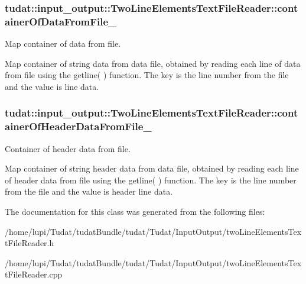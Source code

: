 \subsubsection[{\texorpdfstring{container\+Of\+Data\+From\+File\+\_\+}{containerOfDataFromFile_}}]{ tudat\+::input\+\_\+output\+::\+Two\+Line\+Elements\+Text\+File\+Reader\+::container\+Of\+Data\+From\+File\+\_\+\hspace{0.3cm}{\ttfamily [protected]}}\hypertarget{classtudat_1_1input__output_1_1TwoLineElementsTextFileReader_a1c6c0f8b0d5129531660e25722b86572}{}\label{classtudat_1_1input__output_1_1TwoLineElementsTextFileReader_a1c6c0f8b0d5129531660e25722b86572}


Map container of data from file. 

Map container of string data from data file, obtained by reading each line of data from file using the getline( ) function. The key is the line number from the file and the value is line data. 
\subsubsection[{\texorpdfstring{container\+Of\+Header\+Data\+From\+File\+\_\+}{containerOfHeaderDataFromFile_}}]{ tudat\+::input\+\_\+output\+::\+Two\+Line\+Elements\+Text\+File\+Reader\+::container\+Of\+Header\+Data\+From\+File\+\_\+\hspace{0.3cm}{\ttfamily [protected]}}\hypertarget{classtudat_1_1input__output_1_1TwoLineElementsTextFileReader_aaadd05e1ca6685848534e1d6f4b4292d}{}\label{classtudat_1_1input__output_1_1TwoLineElementsTextFileReader_aaadd05e1ca6685848534e1d6f4b4292d}


Container of header data from file. 

Map container of string header data from data file, obtained by reading each line of header data from file using the getline( ) function. The key is the line number from the file and the value is header line data. 

The documentation for this class was generated from the following files\+:\begin{DoxyCompactItemize}
\item 
/home/lupi/\+Tudat/tudat\+Bundle/tudat/\+Tudat/\+Input\+Output/two\+Line\+Elements\+Text\+File\+Reader.\+h\item 
/home/lupi/\+Tudat/tudat\+Bundle/tudat/\+Tudat/\+Input\+Output/two\+Line\+Elements\+Text\+File\+Reader.\+cpp\end{DoxyCompactItemize}
